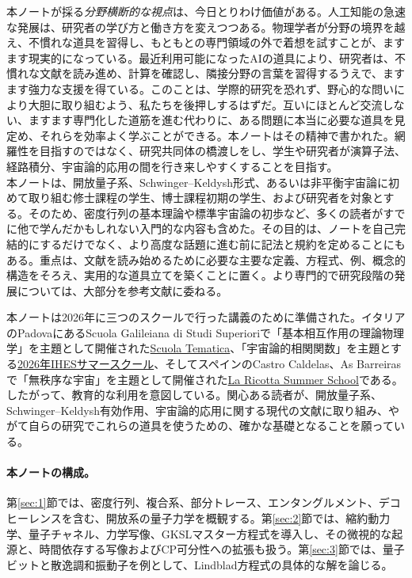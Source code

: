 \documentclass[a4paper,11pt,oneside]{article}
\theoremstyle{definition}
\numberwithin{equation}{section}
\begin{document}
本ノートが採る\textit{分野横断的な視点}は、今日とりわけ価値がある。人工知能の急速な発展は、研究者の学び方と働き方を変えつつある。物理学者が分野の境界を越え、不慣れな道具を習得し、もともとの専門領域の外で着想を試すことが、ますます現実的になっている。最近利用可能になったAIの道具により、研究者は、不慣れな文献を読み進め、計算を確認し、隣接分野の言葉を習得するうえで、ますます強力な支援を得ている。このことは、学際的研究を恐れず、野心的な問いにより大胆に取り組むよう、私たちを後押しするはずだ。互いにほとんど交流しない、ますます専門化した道筋を進む代わりに、ある問題に本当に必要な道具を見定め、それらを効率よく学ぶことができる。本ノートはその精神で書かれた。網羅性を目指すのではなく、研究共同体の橋渡しをし、学生や研究者が演算子法、経路積分、宇宙論的応用の間を行き来しやすくすることを目指す。\\



本ノートは、開放量子系、Schwinger--Keldysh形式、あるいは非平衡宇宙論に初めて取り組む修士課程の学生、博士課程初期の学生、および研究者を対象とする。そのため、密度行列の基本理論や標準宇宙論の初歩など、多くの読者がすでに他で学んだかもしれない入門的な内容も含めた。その目的は、ノートを自己完結的にするだけでなく、より高度な話題に進む前に記法と規約を定めることにもある。重点は、文献を読み始めるために必要な主要な定義、方程式、例、概念的構造をそろえ、実用的な道具立てを築くことに置く。より専門的で研究段階の発展については、大部分を参考文献に委ねる。



本ノートは2026年に三つのスクールで行った講義のために準備された。イタリアのPadovaにあるScuola Galileiana di Studi Superioriで「基本相互作用の理論物理学」を主題として開催された\href{https://scuolagalileiana.unipd.it/wp-content/uploads/2026/03/Scuola-tematica-fisica-DEF.pdf}{Scuola Tematica}、「宇宙論的相関関数」を主題とする\href{https://indico.math.cnrs.fr/event/15597/}{2026年IHESサマースクール}、そしてスペインのCastro Caldelas、As Barreirasで「無秩序な宇宙」を主題として開催された\href{https://indico.global/event/16455/overview}{La Ricotta Summer School}である。したがって、教育的な利用を意図している。関心ある読者が、開放量子系、Schwinger--Keldysh有効作用、宇宙論的応用に関する現代の文献に取り組み、やがて自らの研究でこれらの道具を使うための、確かな基礎となることを願っている。





\paragraph{本ノートの構成。} 第\ref{sec:1}節では、密度行列、複合系、部分トレース、エンタングルメント、デコヒーレンスを含む、開放系の量子力学を概観する。第\ref{sec:2}節では、縮約動力学、量子チャネル、力学写像、GKSLマスター方程式を導入し、その微視的な起源と、時間依存する写像およびCP可分性への拡張も扱う。第\ref{sec:3}節では、量子ビットと散逸調和振動子を例として、Lindblad方程式の具体的な解を論じる。
\end{document}
